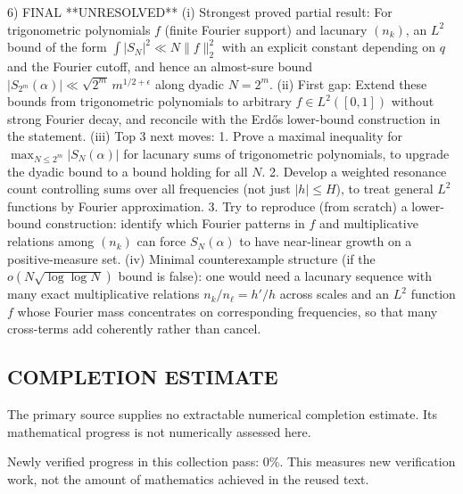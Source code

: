 6) FINAL
**UNRESOLVED**
(i) Strongest proved partial result: For trigonometric polynomials $f$ (finite Fourier support) and lacunary $(n_k)$, an $L^2$ bound of the form $\int|S_N|^2\ll N\|f\|_2^2$ with an explicit constant depending on $q$ and the Fourier cutoff, and hence an almost-sure bound $|S_{2^m}(\alpha)|\ll \sqrt{2^m}\,m^{1/2+\epsilon}$ along dyadic $N=2^m$.
(ii) First gap: Extend these bounds from trigonometric polynomials to arbitrary $f\in L^2([0,1])$ without strong Fourier decay, and reconcile with the Erd\H{o}s lower-bound construction in the statement.
(iii) Top 3 next moves:
  1. Prove a maximal inequality for $\max_{N\le 2^m}|S_N(\alpha)|$ for lacunary sums of trigonometric polynomials, to upgrade the dyadic bound to a bound holding for all $N$.
  2. Develop a weighted resonance count controlling sums over all frequencies (not just $|h|\le H$), to treat general $L^2$ functions by Fourier approximation.
  3. Try to reproduce (from scratch) a lower-bound construction: identify which Fourier patterns in $f$ and multiplicative relations among $(n_k)$ can force $S_N(\alpha)$ to have near-linear growth on a positive-measure set.
(iv) Minimal counterexample structure (if the $o(N\sqrt{\log\log N})$ bound is false): one would need a lacunary sequence with many exact multiplicative relations $n_k/n_\ell=h'/h$ across scales and an $L^2$ function $f$ whose Fourier mass concentrates on corresponding frequencies, so that many cross-terms add coherently rather than cancel.




\subsection*{COMPLETION ESTIMATE}
The primary source supplies no extractable numerical completion estimate. Its mathematical progress is not numerically assessed here.

Newly verified progress in this collection pass: $0\%$. This measures new verification work, not the amount of mathematics achieved in the reused text.
